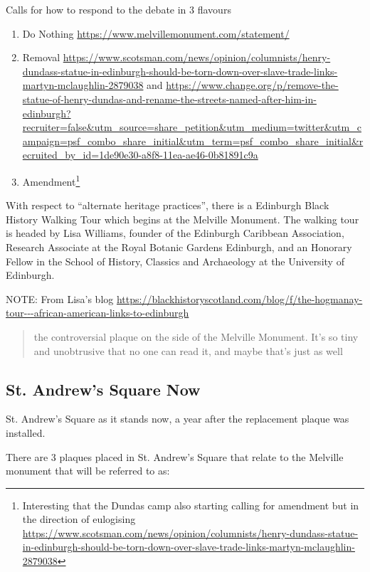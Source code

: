 \documentclass{scrartcl}
\begin{document}
Calls for how to respond to the debate in 3 flavours

\begin{enumerate}
    \item Do Nothing \url{https://www.melvillemonument.com/statement/}
    \item Removal \url{https://www.scotsman.com/news/opinion/columnists/henry-dundass-statue-in-edinburgh-should-be-torn-down-over-slave-trade-links-martyn-mclaughlin-2879038} and \url{https://www.change.org/p/remove-the-statue-of-henry-dundas-and-rename-the-streets-named-after-him-in-edinburgh?recruiter=false&utm_source=share_petition&utm_medium=twitter&utm_campaign=psf_combo_share_initial&utm_term=psf_combo_share_initial&recruited_by_id=1de90e30-a8f8-11ea-ae46-0b81891c9a}
    \item Amendment\footnote{Interesting that the Dundas camp also starting calling for amendment but in the direction of eulogising \url{https://www.scotsman.com/news/opinion/columnists/henry-dundass-statue-in-edinburgh-should-be-torn-down-over-slave-trade-links-martyn-mclaughlin-2879038}} \cite{esclr_2022}
\end{enumerate}

With respect to ``alternate heritage practices'', there is a Edinburgh Black History Walking Tour which begins at the Melville Monument.
The walking tour is headed by Lisa Williams, founder of the Edinburgh Caribbean Association, Research Associate at the Royal Botanic Gardens Edinburgh, and an Honorary Fellow in the School of History, Classics and Archaeology at the University of Edinburgh. 

NOTE: From Lisa's blog \url{https://blackhistoryscotland.com/blog/f/the-hogmanay-tour---african-american-links-to-edinburgh}

\begin{quotation}
    the controversial plaque on the side of the Melville Monument. It's so tiny and unobtrusive that no one can read it, and maybe that's just as well
\end{quotation}



\subsection{St. Andrew's Square Now}

St. Andrew's Square as it stands now, a year after the replacement plaque was installed.

There are 3 plaques placed in St. Andrew's Square that relate to the Melville monument that will be referred to as: 
\end{document}
